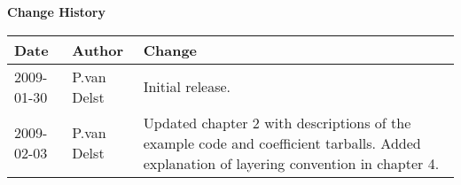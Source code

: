 \thispagestyle{empty}
\vspace*{10cm}
\begin{center}
  {\sffamily\Large\bfseries Change History}
  \begin{table}[htp]
    \centering
    \begin{tabular}{|p{2cm}|p{3cm}|p{8cm}|}
      \hline
      \sffamily\textbf{Date} & \sffamily\textbf{Author} & \sffamily\textbf{Change}\\
      \hline\hline
      2009-01-30 & P.van Delst & Initial release.\\
      \hline
      2009-02-03 & P.van Delst & Updated chapter 2 with descriptions of the example code and coefficient tarballs. Added explanation of layering convention in chapter 4.\\
      \hline
    \end{tabular}
  \end{table}
\end{center}
\clearpage
{}
\setcounter{page}{1}

\setcounter{page}{1}
  \tableofcontents\newpage
  \listoffigures\newpage
  \listoftables\newpage
{}
\setcounter{page}{1}









\begin{appendix}
  
  
  
\end{appendix}



